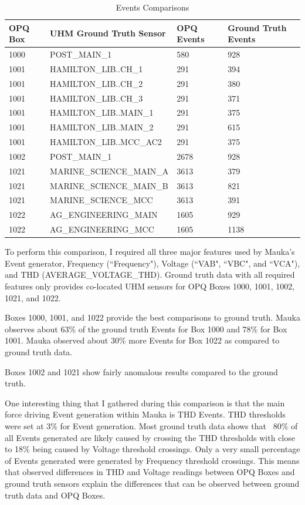 \begin{table}[h]
    \centering
    \caption{Events Comparisons}
    \begin{tabularx}{\textwidth}{lXll}
        \toprule
        \textbf{OPQ Box} & \textbf{UHM Ground Truth Sensor} & \textbf{OPQ Events} & \textbf{Ground Truth Events} \\
        \midrule
        1000 & POST\_MAIN\_1 & 580 & 928 \\
        1001 & HAMILTON\_LIB..CH\_1 & 291 & 394 \\
        1001 & HAMILTON\_LIB..CH\_2 & 291 & 380 \\
        1001 & HAMILTON\_LIB..CH\_3 & 291 & 371 \\
        1001 & HAMILTON\_LIB..MAIN\_1 & 291 & 375 \\
        1001 & HAMILTON\_LIB..MAIN\_2 & 291 & 615 \\
        1001 & HAMILTON\_LIB..MCC\_AC2 & 291 & 375 \\
        1002 & POST\_MAIN\_1 & 2678 & 928 \\
        1021 & MARINE\_SCIENCE\_MAIN\_A & 3613 & 379 \\
        1021 & MARINE\_SCIENCE\_MAIN\_B & 3613 & 821 \\
        1021 & MARINE\_SCIENCE\_MCC & 3613 & 391 \\
        1022 & AG\_ENGINEERING\_MAIN & 1605 & 929 \\
        1022 & AG\_ENGINEERING\_MCC & 1605 & 1138 \\
        \bottomrule
    \end{tabularx}
    \label{table:gt_events}
\end{table}

To perform this comparison, I required all three major features used by Mauka's Event generator, Frequency (``Frequency"), Voltage (``VAB", ``VBC", and ``VCA"), and THD (AVERAGE\_VOLTAGE\_THD). Ground truth data with all required features only provides co-located UHM sensors for OPQ Boxes 1000, 1001, 1002, 1021, and 1022.

Boxes 1000, 1001, and 1022 provide the best comparisons to ground truth. Mauka observes about 63\% of the ground truth Events for Box 1000 and 78\% for Box 1001. Mauka observed about 30\% more Events for Box 1022 as compared to ground truth data.

Boxes 1002 and 1021 show fairly anomalous results compared to the ground truth.

One interesting thing that I gathered during this comparison is that the main force driving Event generation within Mauka is THD Events. THD thresholds were set at 3\% for Event generation. Most ground truth data shows that ~80\% of all Events generated are likely caused by crossing the THD thresholds with close to 18\% being caused by Voltage threshold crossings. Only a very small percentage of Events generated were generated by Frequency threshold crossings. This means that observed differences in THD and Voltage readings between OPQ Boxes and ground truth sensors explain the differences that can be observed between ground truth data and OPQ Boxes.


